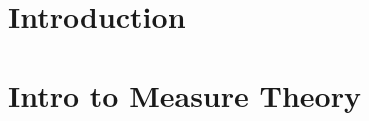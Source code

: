 \documentclass[notitlepage]{report}
\begin{document}
  \createintro
  \newpage

  \setcounter{chapter}{-1}
  \chapter{Introduction}

  

  \newpage
  \setcounter{page}{1}

  \chapter{Intro to Measure Theory}

  
\end{document}
